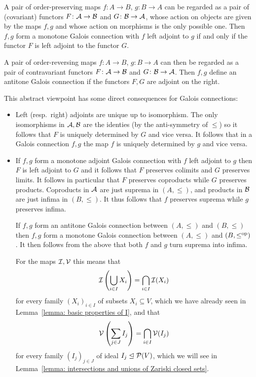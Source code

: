 \begin{remark}
\begin{enumerate}
      A pair of order-preserving maps $f \colon A \to B$, $g \colon B \to A$ can be regarded as a pair of (covariant) functors $F \colon \mathcal{A} \to \mathcal{B}$ and $G \colon \mathcal{B} \to \mathcal{A}$, whose action on objects are given by the maps $f, g$ and whose action on morphisms is the only possible one.
      Then $f, g$ form a monotone Galois connection with $f$ left adjoint to $g$ if and only if the functor $F$ is left adjoint to the functor $G$.
      
      A pair of order-reversing maps $f \colon A \to B$, $g \colon B \to A$ can then be regarded as a pair of contravariant functors $F \colon \mathcal{A} \to \mathcal{B}$ and $G \colon \mathcal{B} \to \mathcal{A}$.
      Then $f, g$ define an antitone Galois connection if the functors $F, G$ are adjoint on the right.
      
      This abstract viewpoint has some direct consequences for Galois connections:
      \begin{itemize}
        \item
          Left (resp.\ right) adjoints are unique up to isomorphism.
          The only isomorphisms in $\mathcal{A}, \mathcal{B}$ are the identies (by the anti-symmetry of $\leq$) so it follows that $F$ is uniquely determined by $G$ and vice versa.
          It follows that in a Galois connection $f,g$ the map $f$ is uniquely determined by $g$ and vice versa.
          
        \item
          If $f, g$ form a monotone adjoint Galois connection with $f$ left adjoint to $g$ then $F$ is left adjoint to $G$ and it follows that $F$ preserves colimits and $G$ preserves limits.
          It follows in particular that $F$ preserves coproducts while $G$ preserves products.
          Coproducts in $\mathcal{A}$ are just suprema in $(A, \leq)$, and products in $\mathcal{B}$ are just infima in $(B, \leq)$.
          It thus follows that $f$ preserves suprema while $g$ preserves infima.
          
          If $f,g$ form an antitone Galois connection between $(A, \leq)$ and $(B, \leq)$ then $f,g$ form a monotone Galois connection between $(A,\leq)$ and $(B,\leq^{\mathrm{op}})$.
          It then follows from the above that both $f$ and $g$ turn suprema into infima.
          
          For the maps $\mathcal{I}, \mathcal{V}$ this means that
          \[
              \mathcal{I}\left( \bigcup_{i \in I} X_i \right)
            = \bigcap_{i \in I} \mathcal{I}(X_i)
          \]
          for every family $(X_i)_{i \in I}$ of subsets $X_i \subseteq V$, which we have already seen in Lemma~\ref{lemma: basic properties of I}, and that
          \[
              \mathcal{V}\left( \sum_{j \in J} I_j \right)
            = \bigcap_{i \in I} \mathcal{V}(I_j)
          \]
          for every family $(I_j)_{j \in J}$ of ideal $I_j \trianglelefteq \mathcal{P}(V)$, which we will see in Lemma~\ref{lemma: intersections and unions of Zariski closed sets}.
      \end{itemize}
  \end{enumerate}
\end{remark}


